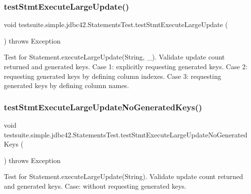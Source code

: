 \subsubsection{\texorpdfstring{test\+Stmt\+Execute\+Large\+Update()}{testStmtExecuteLargeUpdate()}}
{\footnotesize\ttfamily void testsuite.\+simple.\+jdbc42.\+Statements\+Test.\+test\+Stmt\+Execute\+Large\+Update (\begin{DoxyParamCaption}{ }\end{DoxyParamCaption}) throws Exception}

Test for Statement.\+execute\+Large\+Update(\+String, \+\_\+). Validate update count returned and generated keys. Case 1\+: explicitly requesting generated keys. Case 2\+: requesting generated keys by defining column indexes. Case 3\+: requesting generated keys by defining column names. \mbox{\label{classtestsuite_1_1simple_1_1jdbc42_1_1_statements_test_a9cba5de95ea1762518b2af4a7f6f297a}} 
\subsubsection{\texorpdfstring{test\+Stmt\+Execute\+Large\+Update\+No\+Generated\+Keys()}{testStmtExecuteLargeUpdateNoGeneratedKeys()}}
{\footnotesize\ttfamily void testsuite.\+simple.\+jdbc42.\+Statements\+Test.\+test\+Stmt\+Execute\+Large\+Update\+No\+Generated\+Keys (\begin{DoxyParamCaption}{ }\end{DoxyParamCaption}) throws Exception}

Test for Statement.\+execute\+Large\+Update(\+String). Validate update count returned and generated keys. Case\+: without requesting generated keys. \mbox{\label{classtestsuite_1_1simple_1_1jdbc42_1_1_statements_test_ac09050d8cc2762e4ac0ade3ee4e1973d}} 
